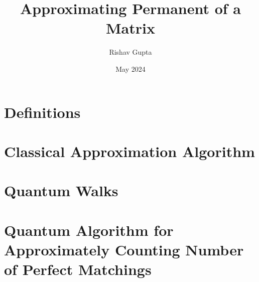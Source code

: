 \documentclass{article}
\title{Approximating Permanent of a Matrix }
\author{Rishav Gupta}
\date{May 2024}
\begin{document}
	
	\maketitle
	\tableofcontents
	\break
\section{Definitions}
	
	\break
\section{Classical Approximation Algorithm}
	
\section{Quantum Walks}
	
\section{Quantum Algorithm for Approximately Counting Number of Perfect Matchings}

\end{document}
